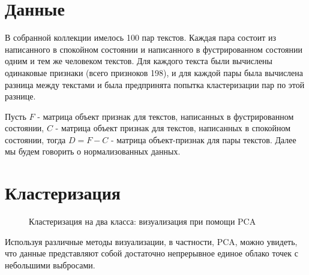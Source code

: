 \documentclass[12pt]{article}
\begin{document}
\section{Данные}

В собранной коллекции имелось 100 пар текстов. Каждая пара состоит из написанного в спокойном состоянии и написанного в фустрированном состоянии одним и тем же человеком текстов. Для каждого текста были вычислены одинаковые признаки (всего призноков 198), и для каждой пары была вычислена разница между текстами и была предпринята попытка кластеризации пар по этой разнице.

Пусть $F$ - матрица объект признак для текстов, написанных в фустрированном состоянии, $C$ - матрица объект признак для текстов, написанных в спокойном состоянии, тогда $D = F-C$ - матрица объект-признак для пары текстов. Далее мы будем говорить о нормализованных данных.

\section{Кластеризация}
\label{sec:cluster}

\begin{figure}[h!]
\label{cluster}
 \caption{Кластеризация на два класса: визуализация при помощи PCA}
\end{figure}

Используя различные методы визуализации, в частности, PCA, можно увидеть, что данные представляют собой достаточно непрерывное единое облако точек с небольшими выбросами.
\end{document}
